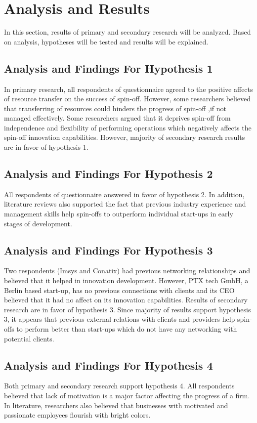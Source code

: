 \chapter{Analysis and Results\label{cha:chapter5}}
In this section, results of primary and secondary research will be analyzed. Based on analysis,
hypotheses will be tested and results will be explained.

\section{Analysis and Findings For Hypothesis 1}
In primary research, all respondents of questionnaire agreed to the positive affects of resource
transfer on the success of spin-off. However, some researchers believed that transferring of
resources could hinders the progress of spin-off ,if not managed effectively. Some researchers
argued that it deprives spin-off from independence and flexibility of performing operations which
negatively affects the spin-off innovation capabilities. However, majority of secondary research results are in
favor of hypothesis 1.

\section{Analysis and Findings For Hypothesis 2}
All respondents of questionnaire answered in favor of hypothesis 2. In addition, literature reviews
also supported the fact that previous industry experience and management skills help spin-offs to
outperform individual start-ups in early stages of development.

\section{Analysis and Findings For Hypothesis 3}
Two respondents (Imsys and Conatix) had previous networking relationships and believed that it
helped in innovation development. However, PTX tech GmbH, a Berlin based start-up, has no
previous connections with clients and its CEO believed that it had no affect on its innovation
capabilities. Results of secondary research are in favor of hypothesis 3. Since majority of results
support hypothesis 3, it appears that previous external relations with clients and providers help spin-
offs to perform better than start-ups which do not have any networking with potential clients.


\section{Analysis and Findings For Hypothesis 4}

Both primary and secondary research support hypothesis 4. All respondents believed that lack of
motivation is a major factor affecting the progress of a firm. In literature, researchers also believed
that businesses with motivated and passionate employees flourish with bright colors.